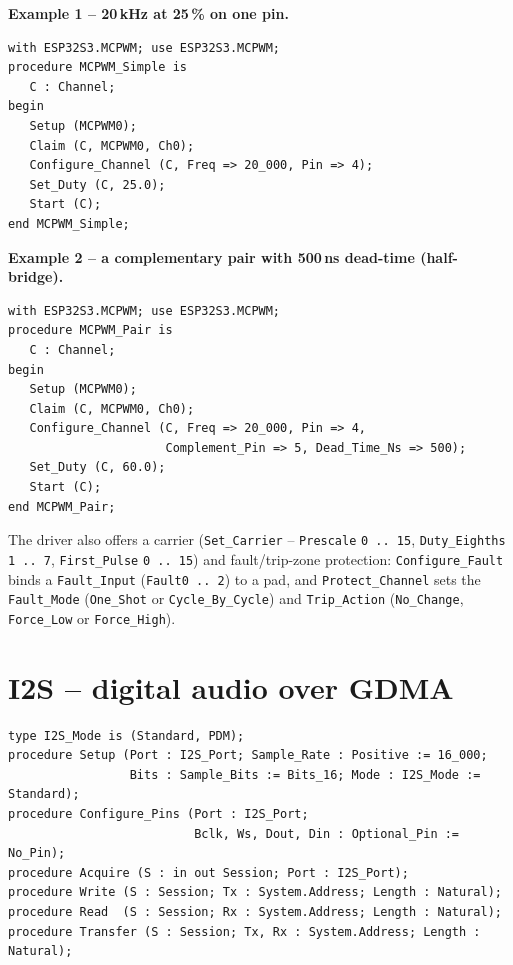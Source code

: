 \textbf{Example 1 -- 20\,kHz at 25\,\% on one pin.}
\begin{lstlisting}
with ESP32S3.MCPWM; use ESP32S3.MCPWM;
procedure MCPWM_Simple is
   C : Channel;
begin
   Setup (MCPWM0);
   Claim (C, MCPWM0, Ch0);
   Configure_Channel (C, Freq => 20_000, Pin => 4);
   Set_Duty (C, 25.0);
   Start (C);
end MCPWM_Simple;
\end{lstlisting}

\textbf{Example 2 -- a complementary pair with 500\,ns dead-time (half-bridge).}
\begin{lstlisting}
with ESP32S3.MCPWM; use ESP32S3.MCPWM;
procedure MCPWM_Pair is
   C : Channel;
begin
   Setup (MCPWM0);
   Claim (C, MCPWM0, Ch0);
   Configure_Channel (C, Freq => 20_000, Pin => 4,
                      Complement_Pin => 5, Dead_Time_Ns => 500);
   Set_Duty (C, 60.0);
   Start (C);
end MCPWM_Pair;
\end{lstlisting}
The driver also offers a carrier (\texttt{Set\_Carrier} -- \texttt{Prescale}
\texttt{0\,..\,15}, \texttt{Duty\_Eighths} \texttt{1\,..\,7}, \texttt{First\_Pulse}
\texttt{0\,..\,15}) and fault/trip-zone protection: \texttt{Configure\_Fault}
binds a \texttt{Fault\_Input} (\texttt{Fault0\,..\,2}) to a pad, and
\texttt{Protect\_Channel} sets the \texttt{Fault\_Mode} (\texttt{One\_Shot} or
\texttt{Cycle\_By\_Cycle}) and \texttt{Trip\_Action} (\texttt{No\_Change},
\texttt{Force\_Low} or \texttt{Force\_High}).

\section{I2S -- digital audio over GDMA}

\begin{lstlisting}
type I2S_Mode is (Standard, PDM);
procedure Setup (Port : I2S_Port; Sample_Rate : Positive := 16_000;
                 Bits : Sample_Bits := Bits_16; Mode : I2S_Mode := Standard);
procedure Configure_Pins (Port : I2S_Port;
                          Bclk, Ws, Dout, Din : Optional_Pin := No_Pin);
procedure Acquire (S : in out Session; Port : I2S_Port);
procedure Write (S : Session; Tx : System.Address; Length : Natural);
procedure Read  (S : Session; Rx : System.Address; Length : Natural);
procedure Transfer (S : Session; Tx, Rx : System.Address; Length : Natural);
\end{lstlisting}

